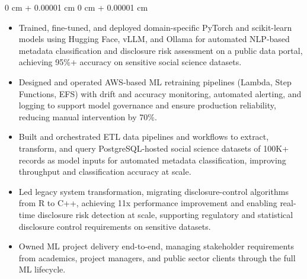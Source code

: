 \documentclass[6pt, letterpaper]{article}
\newenvironment{highlights}{
    \begin{itemize}[
        topsep=0.02 cm,
        parsep=0.02 cm,
        partopsep=0pt,
        itemsep=0pt,
        leftmargin=0 cm + 8pt
    ]
}{
    \end{itemize}
} %
\newenvironment{onecolentry}{
    \begin{adjustwidth}{
        0 cm + 0.00001 cm
    }{
        0 cm + 0.00001 cm
    }
}{
    \end{adjustwidth}
} %
\begin{document}
        \begin{onecolentry}
        \begin{highlights}

            \item Trained, fine-tuned, and deployed domain-specific PyTorch and scikit-learn models using Hugging Face, vLLM, and Ollama for automated NLP-based metadata classification and disclosure risk assessment on a public data portal, achieving 95\%+ accuracy on sensitive social science datasets.
            \item Designed and operated AWS-based ML retraining pipelines (Lambda, Step Functions, EFS) with drift and accuracy monitoring, automated alerting, and logging to support model governance and ensure production reliability, reducing manual intervention by 70\%.
            \item Built and orchestrated ETL data pipelines and workflows to extract, transform, and query PostgreSQL-hosted social science datasets of 100K+ records as model inputs for automated metadata classification, improving throughput and classification accuracy at scale.
            \item Led legacy system transformation, migrating disclosure-control algorithms from R to C++, achieving 11x performance improvement and enabling real-time disclosure risk detection at scale, supporting regulatory and statistical disclosure control requirements on sensitive datasets.
            \item Owned ML project delivery end-to-end, managing stakeholder requirements from academics, project managers, and public sector clients through the full ML lifecycle.

        \end{highlights}
        \end{onecolentry}
\end{document}
